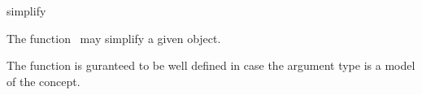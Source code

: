 \begin{ccRefFunction}{simplify}

\ccDefinition

The function \ccRefName\ may simplify a given object. 

The function is guranteed to be well defined in case the argument type 
is a model of the  concept. 


{}


\ccSeeAlso

\\
\\

\end{ccRefFunction}
